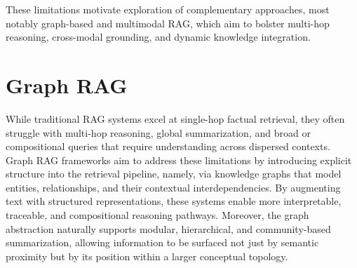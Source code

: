 \documentclass[12pt,twoside]{report}
\begin{document}
These limitations motivate exploration of complementary approaches, most notably graph-based and multimodal RAG, which aim to bolster multi-hop reasoning, cross-modal grounding, and dynamic knowledge integration.

\section{Graph RAG}
While traditional RAG systems excel at single-hop factual retrieval, they often struggle with multi-hop reasoning, global summarization, and broad or compositional queries that require understanding across dispersed contexts. Graph RAG frameworks aim to address these limitations by introducing explicit structure into the retrieval pipeline, namely, via knowledge graphs that model entities, relationships, and their contextual interdependencies. By augmenting text with structured representations, these systems enable more interpretable, traceable, and compositional reasoning pathways. Moreover, the graph abstraction naturally supports modular, hierarchical, and community-based summarization, allowing information to be surfaced not just by semantic proximity but by its position within a larger conceptual topology.

\end{document}
